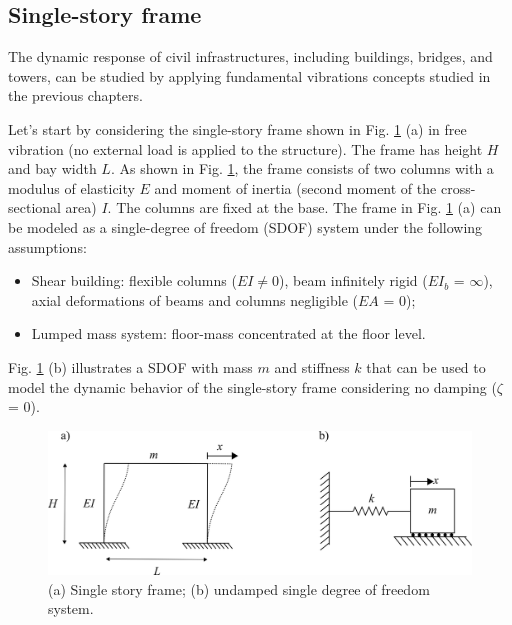 \documentclass[12pt,letter]{article}
\numberwithin{ex}{section} %
\numberwithin{re}{section} %
\numberwithin{vcs}{section} %
\begin{document}
	\subsection{Single-story frame}


The dynamic response of civil infrastructures, including buildings, bridges, and towers, can be studied by applying fundamental vibrations concepts studied in the previous chapters. 

Let's start by considering the single-story frame shown in Fig. \ref{fig:one_story_frame_example} (a) in free vibration (no external load is applied to the structure). The frame has height $H$ and bay width $L$. As shown in Fig. \ref{fig:one_story_frame_example}, the frame consists of two columns with a modulus of elasticity $E$ and moment of inertia (second moment of the cross-sectional area) $I$. The columns are fixed at the base. The frame in Fig. \ref{fig:one_story_frame_example} (a) can be modeled as a single-degree of freedom (SDOF) system under the following assumptions:

\begin{itemize}
	\item Shear building: flexible columns ($EI \neq 0$), beam infinitely rigid ($EI_b$ = $\infty$), axial deformations of beams and columns negligible ($EA$ = 0);
	\item Lumped mass system: floor-mass concentrated at the floor level.
\end{itemize}

Fig. \ref{fig:one_story_frame_example} (b) illustrates a SDOF with mass $m$ and stiffness $k$ that can be used to model the dynamic behavior of the single-story frame considering no damping ($\zeta$ = 0). 

\begin{figure}[H]
	\centering
	\includegraphics{../figures/Single_story_frame.png}
	\caption{(a) Single story frame; (b) undamped single degree of freedom system.}
	\label{fig:one_story_frame_example}
\end{figure}
\end{document}
